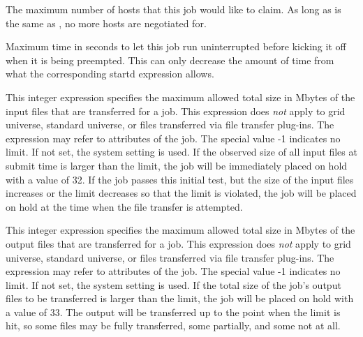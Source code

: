 \begin{description}
\item[\AdAttr{MaxHosts}:]  The maximum number of hosts that this job would
like to claim. As long as  is the same as
, no more hosts are negotiated for.

\item[\AdAttr{MaxJobRetirementTime}:]  Maximum time in seconds to let this
job run uninterrupted before kicking it off when it is being preempted.
This can only decrease the amount of time from what the corresponding
startd expression allows.

\item[\AdAttr{MaxTransferInputMB}:]
This integer expression specifies the maximum allowed total size in
Mbytes of the input files that are transferred for a job.  This
expression does \emph{not} apply to grid universe, standard universe, or
files transferred via file transfer plug-ins.  The expression may refer
to attributes of the job.  The special value -1 indicates no limit.
If not set, the system setting  is
used.  If the observed size of all input files at submit time is
larger than the limit, the job will be immediately placed on hold with
a  value of 32.
If the job passes this initial test, but the size of
the input files increases or the limit decreases so that the limit is
violated, the job will be placed on hold at the time when the file
transfer is attempted.

\item[\AdAttr{MaxTransferOutputMB}:]
This integer expression specifies the maximum allowed total size in
Mbytes of the output files that are transferred for a job.  This
expression does \emph{not} apply to grid universe, standard universe, or
files transferred via file transfer plug-ins.  The expression may refer
to attributes of the job.  The special value -1 indicates no limit.
If not set, the system setting  is
used.  If the total size of the job's output files to be transferred
is larger than the limit, the job will be placed on hold with 
a  value of 33.
The output will be transferred up to the point when the
limit is hit, so some files may be fully transferred, some partially,
and some not at all.


\end{description}
